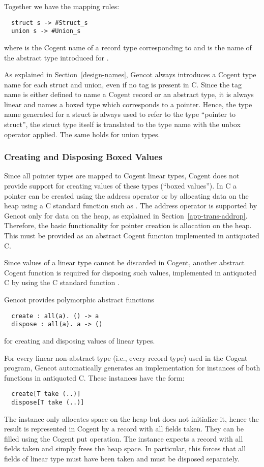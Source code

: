 Together we have the mapping rules:
\begin{verbatim}
  struct s -> #Struct_s
  union s -> #Union_s
\end{verbatim}
where  is the Cogent name of a record type corresponding to  and  is the
name of the abstract type introduced for .

As explained in Section~\ref{design-names}, Gencot always introduces a Cogent type name for each struct and union,
even if no tag is present in C. Since the tag name is either defined to name a Cogent record or an abstract type,
it is always linear and names a boxed type which corresponds to a pointer. Hence, the type name generated for a struct
is always used to refer to the type ``pointer to struct'', the struct type itself is translated to the type name 
with the unbox operator applied. The same holds for union types.

\subsubsection{Creating and Disposing Boxed Values}

Since all pointer types are mapped to Cogent linear types, Cogent does not provide support for creating values
of these types (``boxed values''). In C a pointer can be created using the address operator \code{\&} or by allocating data on
the heap using a C standard function such as . The address operator is supported by Gencot
only for data on the heap, as explained in Section~\ref{app-trans-addrop}. Therefore, the basic functionality
for pointer creation is allocation on the heap. This must be provided as an abstract Cogent function implemented
in antiquoted C.

Since values of a linear type cannot be discarded in Cogent, another abstract Cogent function is required for
disposing such values, implemented in antiquoted C by using the C standard function .

Gencot provides polymorphic abstract functions
\begin{verbatim}
  create : all(a). () -> a
  dispose : all(a). a -> ()
\end{verbatim}
for creating and disposing values of linear types.

For every linear non-abstract type  (i.e., every record type) used in the Cogent program, Gencot automatically
generates an implementation for instances of both functions in antiquoted C. These instances have the form:
\begin{verbatim}
  create[T take (..)]
  dispose[T take (..)]
\end{verbatim}
The  instance only allocates space on the heap but does not initialize it, hence the result is 
represented in Cogent by a record with all fields taken. They can be filled using the Cogent put operation.
The  instance expects a record with all fields taken and simply frees the heap space. In particular,
this forces that all fields of linear type must have been taken and must be disposed separately.

